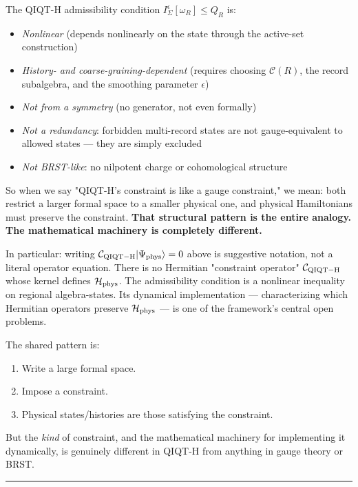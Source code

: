 \documentclass[11pt,a4paper]{article}
\begin{document}
The QIQT-H admissibility condition $I_\Sigma^\epsilon[\omega_R] \le Q_R$ is:

\begin{itemize}
  \item \emph{Nonlinear} (depends nonlinearly on the state through the active-set construction)
  \item \emph{History- and coarse-graining-dependent} (requires choosing $\mathcal{C}(R)$, the record subalgebra, and the smoothing parameter $\epsilon$)
  \item \emph{Not from a symmetry} (no generator, not even formally)
  \item \emph{Not a redundancy}: forbidden multi-record states are not gauge-equivalent to allowed states — they are simply excluded
  \item \emph{Not BRST-like}: no nilpotent charge or cohomological structure
\end{itemize}

So when we say "QIQT-H's constraint is like a gauge constraint," we mean: both restrict a larger formal space to a smaller physical one, and physical Hamiltonians must preserve the constraint. \textbf{That structural pattern is the entire analogy. The mathematical machinery is completely different.}

In particular: writing $\mathcal{C}_{\rm QIQT-H}|\Psi_{\rm phys}\rangle = 0$ above is suggestive notation, not a literal operator equation. There is no Hermitian "constraint operator" $\mathcal{C}_{\rm QIQT-H}$ whose kernel defines $\mathcal{H}_{\rm phys}$. The admissibility condition is a nonlinear inequality on regional algebra-states. Its dynamical implementation — characterizing which Hermitian operators preserve $\mathcal{H}_{\rm phys}$ — is one of the framework's central open problems.

The shared pattern is:

\begin{enumerate}
  \item Write a large formal space.
  \item Impose a constraint.
  \item Physical states/histories are those satisfying the constraint.
\end{enumerate}

But the \emph{kind} of constraint, and the mathematical machinery for implementing it dynamically, is genuinely different in QIQT-H from anything in gauge theory or BRST.

\medskip\hrule\medskip
\end{document}
